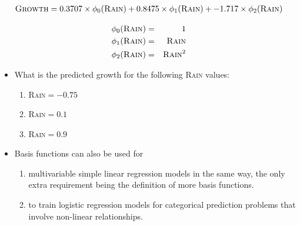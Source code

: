 \documentclass[xcolor={table}]{beamer}
\newcommand{\featN}[1]{\textsc{#1}}
\begin{document}
 \begin{frame}[plain]
\begin{footnotesize}
\begin{eqnarray*}
\featN{Growth} = 0.3707 \times \phi_0(\featN{Rain})+ 0.8475 \times \phi_1(\featN{Rain}) + -1.717 \times \phi_2(\featN{Rain})
\end{eqnarray*}
\end{footnotesize}
\begin{eqnarray*}
\phi_0(\featN{Rain}) & = & 1 \\
\phi_1(\featN{Rain}) & = & \featN{Rain} \\
\phi_2(\featN{Rain}) & = & \featN{Rain}^2 
\end{eqnarray*}
\begin{itemize}
	\item What is the predicted growth for the following \featN{Rain} values:
	\begin{enumerate}
		\item \featN{Rain}$=-0.75$
		\item \featN{Rain}$=0.1$
		\item \featN{Rain}$=0.9$
	\end{enumerate}
\end{itemize}
\end{frame} 


\begin{frame}
	\begin{itemize}
		\item Basis functions can also be used for 
		\begin{enumerate}
			\item multivariable simple linear regression models in the same way, the only extra requirement being the definition of more basis functions. 
			\item to train logistic regression models for categorical prediction problems that involve non-linear relationships.
		\end{enumerate}
	\end{itemize}
\end{frame}
\end{document}
